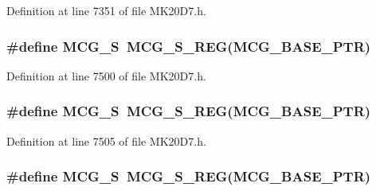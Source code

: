 Definition at line 7351 of file M\+K20\+D7.\+h.

\subsubsection[{\texorpdfstring{M\+C\+G\+\_\+S}{MCG_S}}]{\setlength{\rightskip}{0pt plus 5cm}\#define M\+C\+G\+\_\+S~{\bf M\+C\+G\+\_\+\+S\+\_\+\+R\+EG}({\bf M\+C\+G\+\_\+\+B\+A\+S\+E\+\_\+\+P\+TR})}\hypertarget{group___m_c_g___register___accessor___macros_ga371e03281a8383e9dd300c0502fbcaf6}{}\label{group___m_c_g___register___accessor___macros_ga371e03281a8383e9dd300c0502fbcaf6}


Definition at line 7500 of file M\+K20\+D7.\+h.

\subsubsection[{\texorpdfstring{M\+C\+G\+\_\+S}{MCG_S}}]{\setlength{\rightskip}{0pt plus 5cm}\#define M\+C\+G\+\_\+S~{\bf M\+C\+G\+\_\+\+S\+\_\+\+R\+EG}({\bf M\+C\+G\+\_\+\+B\+A\+S\+E\+\_\+\+P\+TR})}\hypertarget{group___m_c_g___register___accessor___macros_ga371e03281a8383e9dd300c0502fbcaf6}{}\label{group___m_c_g___register___accessor___macros_ga371e03281a8383e9dd300c0502fbcaf6}


Definition at line 7505 of file M\+K20\+D7.\+h.

\subsubsection[{\texorpdfstring{M\+C\+G\+\_\+S}{MCG_S}}]{\setlength{\rightskip}{0pt plus 5cm}\#define M\+C\+G\+\_\+S~{\bf M\+C\+G\+\_\+\+S\+\_\+\+R\+EG}({\bf M\+C\+G\+\_\+\+B\+A\+S\+E\+\_\+\+P\+TR})}\hypertarget{group___m_c_g___register___accessor___macros_ga371e03281a8383e9dd300c0502fbcaf6}{}\label{group___m_c_g___register___accessor___macros_ga371e03281a8383e9dd300c0502fbcaf6}


